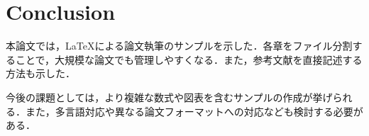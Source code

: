 \section{Conclusion}

本論文では，LaTeXによる論文執筆のサンプルを示した．各章をファイル分割することで，大規模な論文でも管理しやすくなる．また，参考文献を直接記述する方法も示した．

今後の課題としては，より複雑な数式や図表を含むサンプルの作成が挙げられる．また，多言語対応や異なる論文フォーマットへの対応なども検討する必要がある．
